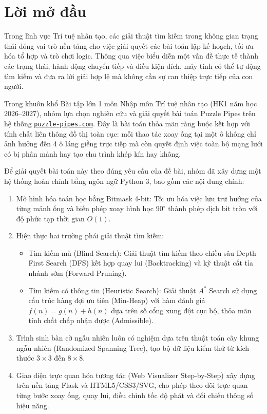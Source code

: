 \documentclass[a4paper]{article}
\begin{document}

\tableofcontents
\newpage

\section*{Lời mở đầu}

Trong lĩnh vực Trí tuệ nhân tạo, các giải thuật tìm kiếm trong không gian trạng thái đóng vai trò nền tảng cho việc giải quyết các bài toán lập kế hoạch, tối ưu hóa tổ hợp và trò chơi logic. Thông qua việc biểu diễn một vấn đề thực tế thành các trạng thái, hành động chuyển tiếp và điều kiện đích, máy tính có thể tự động tìm kiếm và đưa ra lời giải hợp lệ mà không cần sự can thiệp trực tiếp của con người.

Trong khuôn khổ Bài tập lớn 1 môn Nhập môn Trí tuệ nhân tạo (HK1 năm học 2026--2027), nhóm lựa chọn nghiên cứu và giải quyết bài toán Puzzle Pipes trên hệ thống \href{https://www.puzzle-pipes.com/}{\texttt{puzzle-pipes.com}}. Đây là bài toán thỏa mãn ràng buộc kết hợp với tính chất liên thông đồ thị toàn cục: mỗi thao tác xoay ống tại một ô không chỉ ảnh hưởng đến 4 ô láng giềng trực tiếp mà còn quyết định việc toàn bộ mạng lưới có bị phân mảnh hay tạo chu trình khép kín hay không.

Để giải quyết bài toán này theo đúng yêu cầu của đề bài, nhóm đã xây dựng một hệ thống hoàn chỉnh bằng ngôn ngữ Python 3, bao gồm các nội dung chính:
\begin{enumerate}
    \item Mô hình hóa toán học bằng Bitmask 4-bit: Tối ưu hóa việc lưu trữ hướng của từng mảnh ống và biến phép xoay hình học $90^\circ$ thành phép dịch bit tròn với độ phức tạp thời gian $O(1)$.
    \item Hiện thực hai trường phái giải thuật tìm kiếm:
    \begin{itemize}
        \item Tìm kiếm mù (Blind Search): Giải thuật tìm kiếm theo chiều sâu Depth-First Search (DFS) kết hợp quay lui (Backtracking) và kỹ thuật cắt tỉa nhánh sớm (Forward Pruning).
        \item Tìm kiếm có thông tin (Heuristic Search): Giải thuật $A^*$ Search sử dụng cấu trúc hàng đợi ưu tiên (Min-Heap) với hàm đánh giá $f(n) = g(n) + h(n)$ dựa trên số cổng xung đột cục bộ, thỏa mãn tính chất chấp nhận được (Admissible).
    \end{itemize}
    \item Trình sinh bàn cờ ngẫu nhiên luôn có nghiệm dựa trên thuật toán cây khung ngẫu nhiên (Randomized Spanning Tree), tạo bộ dữ liệu kiểm thử từ kích thước $3 \times 3$ đến $8 \times 8$.
    \item Giao diện trực quan hóa tương tác (Web Visualizer Step-by-Step) xây dựng trên nền tảng Flask và HTML5/CSS3/SVG, cho phép theo dõi trực quan từng bước xoay ống, quay lui, điều chỉnh tốc độ phát và đối chiếu thông số hiệu năng.
\end{enumerate}
\end{document}
